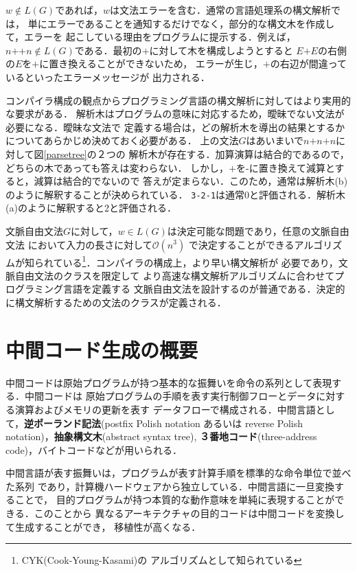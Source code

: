 \documentclass[a4j,dvipdfmx]{jbook}
\begin{document}
$w\notin L(G)$であれば，$w$は文法エラーを含む．通常の言語処理系の構文解析では，
単にエラーであることを通知するだけでなく，部分的な構文木を作成して，エラーを
起こしている理由をプログラムに提示する．例えば，$n\texttt{+}\texttt{+}n\notin
  L(G)$である．最初の$\texttt{+}$に対して木を構成しようとすると
$E\texttt{+}E$の右側の$E$を$\texttt{+}$に置き換えることができないため，
エラーが生じ，$\texttt{+}$の右辺が間違っているといったエラーメッセージが
出力される．

コンパイラ構成の観点からプログラミング言語の構文解析に対してはより実用的な要求がある．
解析木はプログラムの意味に対応するため，曖昧でない文法が必要になる．曖昧な文法で
定義する場合は，どの解析木を導出の結果とするかについてあらかじめ決めておく必要がある．
上の文法$G$はあいまいで$n\texttt{+}n\texttt{+}n$に対して図\ref{parsetree}の２つの
解析木が存在する．加算演算は結合的であるので，どちらの木であっても答えは変わらない．
しかし，$\texttt{+}$を$\texttt{-}$に置き換えて減算とすると，減算は結合的でないので
答えが定まらない．このため，通常は解析木(b)のように解釈することが決められている．
\texttt{3-2-1}は通常0と評価される．解析木(a)のように解釈すると2と評価される．

文脈自由文法$G$に対して，$w\in L(G)$は決定可能な問題であり，任意の文脈自由文法
において入力の長さに対して$\mathcal{O}(n^3)$
で決定することができるアルゴリズムが知られている\footnote{CYK(Cook-Young-Kasami)の
  アルゴリズムとして知られている}．コンパイラの構成上，より早い構文解析が
必要であり，文脈自由文法のクラスを限定して
より高速な構文解析アルゴリズムに合わせてプログラミング言語を定義する
文脈自由文法を設計するのが普通である．決定的に構文解析するための文法のクラスが定義される．

\section{中間コード生成の概要}

中間コードは原始プログラムが持つ基本的な振舞いを命令の系列として表現する．中間コードは
原始プログラムの手順を表す実行制御フローとデータに対する演算およびメモリの更新を表す
データフローで構成される．中間言語として，{\bf 逆ポーランド記法}(postfix Polish notation
あるいは reverse Polish notation)，{\bf 抽象構文木}(abstract syntax tree),
{\bf ３番地コード}(three-address code)，バイトコードなどが用いられる．

中間言語が表す振舞いは，プログラムが表す計算手順を標準的な命令単位で並べた系列
であり，計算機ハードウェアから独立している．中間言語に一旦変換することで，
目的プログラムが持つ本質的な動作意味を単純に表現することができる．このことから
異なるアーキテクチャの目的コードは中間コードを変換して生成することができ，
移植性が高くなる．
\end{document}

